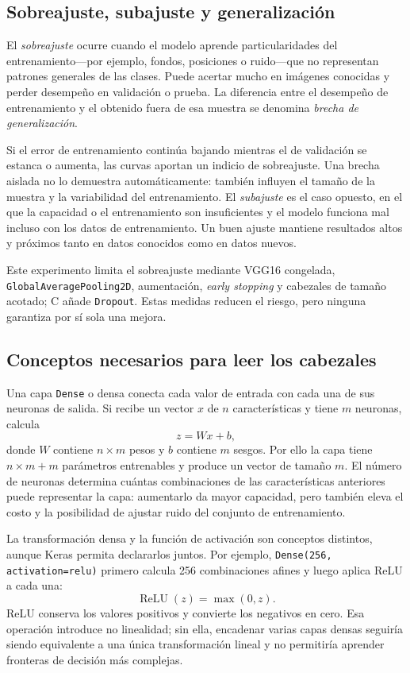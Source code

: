\documentclass[11pt,letterpaper]{article}
\begin{document}
\subsection{Sobreajuste, subajuste y generalización}
El \emph{sobreajuste} ocurre cuando el modelo aprende particularidades del
entrenamiento---por ejemplo, fondos, posiciones o ruido---que no representan
patrones generales de las clases. Puede acertar mucho en imágenes conocidas y
perder desempeño en validación o prueba. La diferencia entre el desempeño de
entrenamiento y el obtenido fuera de esa muestra se denomina \emph{brecha de
generalización}.

Si el error de entrenamiento continúa bajando mientras el de validación se
estanca o aumenta, las curvas aportan un indicio de sobreajuste. Una brecha
aislada no lo demuestra automáticamente: también influyen el tamaño de la
muestra y la variabilidad del entrenamiento. El \emph{subajuste} es el caso
opuesto, en el que la capacidad o el entrenamiento son insuficientes y el
modelo funciona mal incluso con los datos de entrenamiento. Un buen ajuste
mantiene resultados altos y próximos tanto en datos conocidos como en datos
nuevos.

Este experimento limita el sobreajuste mediante VGG16 congelada,
\texttt{GlobalAveragePooling2D}, aumentación, \emph{early stopping} y
cabezales de tamaño acotado; C añade \texttt{Dropout}. Estas medidas reducen
el riesgo, pero ninguna garantiza por sí sola una mejora.

\subsection{Conceptos necesarios para leer los cabezales}
Una capa \texttt{Dense} o densa conecta cada valor de entrada con cada una de
sus neuronas de salida. Si recibe un vector $x$ de $n$ características y tiene
$m$ neuronas, calcula
\[
z=Wx+b,
\]
donde $W$ contiene $n\times m$ pesos y $b$ contiene $m$ sesgos. Por ello la
capa tiene $n\times m+m$ parámetros entrenables y produce un vector de tamaño
$m$. El número de neuronas determina cuántas combinaciones de las
características anteriores puede representar la capa: aumentarlo da mayor
capacidad, pero también eleva el costo y la posibilidad de ajustar ruido del
conjunto de entrenamiento.

La transformación densa y la función de activación son conceptos distintos,
aunque Keras permita declararlos juntos. Por ejemplo,
\texttt{Dense(256, activation=relu)} primero calcula 256 combinaciones
afines y luego aplica ReLU a cada una:
\[
\operatorname{ReLU}(z)=\max(0,z).
\]
ReLU conserva los valores positivos y convierte los negativos en cero. Esa
operación introduce no linealidad; sin ella, encadenar varias capas densas
seguiría siendo equivalente a una única transformación lineal y no permitiría
aprender fronteras de decisión más complejas.
\end{document}
